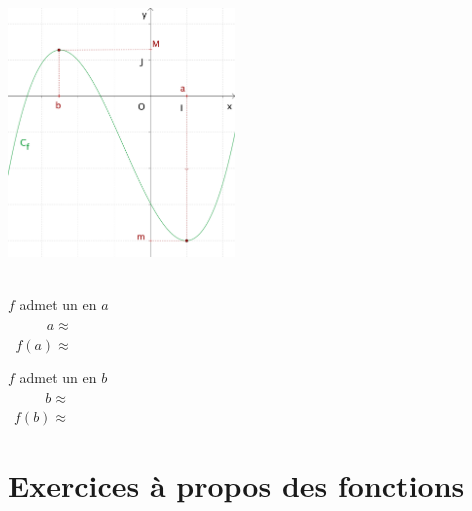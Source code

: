 \begin{minipage}[c]{0.4\linewidth}
  \centering
  \includegraphics[width=6cm]{F_Extrema.pdf}
\end{minipage}
\quad
\begin{minipage}[c]{0.4\linewidth}
  \centering
  \ \\
  $f$ admet un \hspace{2cm} en $a$  \\[2ex]
  $\phantom{f(a)}a\approx$ \\[2ex]
  $\phantom{a}f(a)\approx $ \\[2em]
  
  \bigskip

  $f$ admet un \hspace{2cm} en $b$  \\[2ex]
  $\phantom{f(b)}b\approx$ \\[2ex]
  $\phantom{b}f(b)\approx $   
\end{minipage}



\section{Exercices à propos des fonctions}


\newpage



